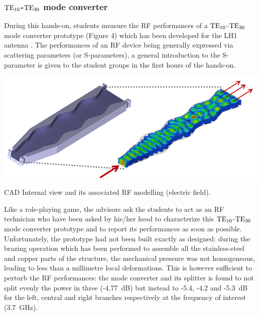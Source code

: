 \subsubsection{${\mathrm{TE}}_{10}$-${\mathrm{TE}}_{30}$ mode converter}

During this hands-on, students measure the RF performances of a ${\mathrm{TE}}_{10}$-${\mathrm{TE}}_{30}$ mode converter prototype (Figure 4) which has been developed for the LH1 antenna . The performances of an RF device being generally expressed via scattering parameters (or S-parameters), a general introduction to the S-parameter is given to the student groups in the first hours of the hands-on. 

\begin{marginfigure}
	\centering
	\includegraphics[width=1.0\linewidth]{figures/chap5/handson_LH_2}
	\caption{CAD Internal view and its associated RF modelling (electric field).}
	\label{fig:handsonlh2}
\end{marginfigure}

Like a role-playing game, the advisors ask the students to act as an RF technician who have been asked by his/her head to characterize this ${\mathrm{TE}}_{10}$-${\mathrm{TE}}_{30}$ mode converter prototype and to report its performances as soon as possible. Unfortunately, the prototype had not been built exactly as designed: during the brazing operation which has been performed to assemble all the stainless-steel and copper parts of the structure, the mechanical pressure was not homogeneous, leading to less than a millimetre local deformations. This is however sufficient to perturb the RF performances: the mode converter and its splitter is found to not split evenly the power in three (-4.77~dB) but instead to -5.4, -4.2 and -5.3~dB for the left, central and right branches respectively at the frequency of interest (3.7~GHz). 

